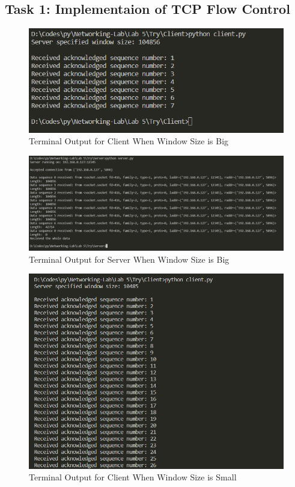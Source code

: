 \documentclass[11pt]{article}
\begin{document}
    \subsection{Task 1: Implementaion of TCP Flow Control}
    \begin{figure}[h]
        \centering
        \includegraphics[width=1.0\textwidth]{client.png}
        \caption{Terminal Output for Client When Window Size is Big}
        \label{fig:response_message}
    \end{figure}
    \FloatBarrier
    \begin{figure}[h]
        \centering
        \includegraphics[width=1.0\textwidth]{server.png}
        \caption{Terminal Output for Server When Window Size is Big}
        \label{fig:response_message}
    \end{figure}
    \FloatBarrier
    \begin{figure}[h]
        \centering
        \includegraphics[width=1.0\textwidth]{client2.png}
        \caption{Terminal Output for Client When Window Size is Small}
        \label{fig:response_message}
    \end{figure}
\end{document}
